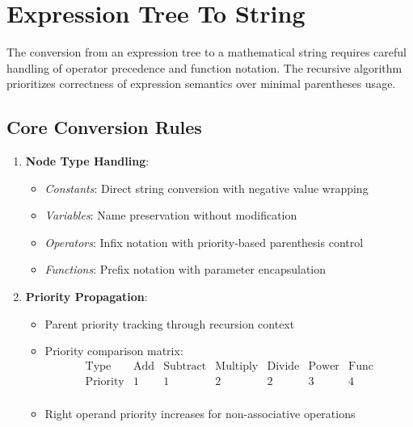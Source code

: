 \documentclass{report}
\begin{document}
\section{Expression Tree To String}

The conversion from an expression tree to a mathematical string requires careful handling of operator precedence and function notation. The recursive algorithm prioritizes correctness of expression semantics over minimal parentheses usage.

\subsection*{Core Conversion Rules}

\begin{enumerate}
    \item \textbf{Node Type Handling}:
    \begin{itemize}
        \item \textit{Constants}: Direct string conversion with negative value wrapping
        \item \textit{Variables}: Name preservation without modification
        \item \textit{Operators}: Infix notation with priority-based parenthesis control
        \item \textit{Functions}: Prefix notation with parameter encapsulation
    \end{itemize}

    \item \textbf{Priority Propagation}:
    \begin{itemize}
        \item Parent priority tracking through recursion context
        \item Priority comparison matrix:
        \begin{equation*}
        \begin{array}{c|cccccc}
        \text{Type} & \text{Add} & \text{Subtract} & \text{Multiply} & \text{Divide} & \text{Power} & \text{Func} \\
        \hline
        \text{Priority} & 1 & 1 & 2 & 2 & 3 & 4 \\
        \end{array}
        \end{equation*}
        \item Right operand priority increases for non-associative operations
    \end{itemize}
\end{enumerate}
\end{document}
